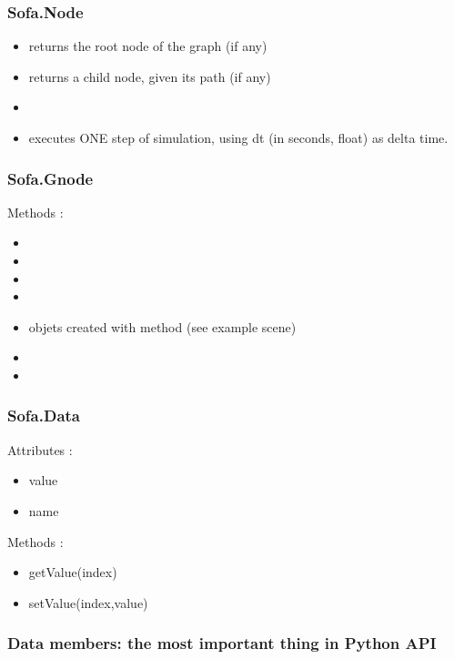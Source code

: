 \subsubsection{Sofa.Node}
\begin{itemize}
\item {} returns the root node of the graph (if any) 
\item {} returns a child node, given its path (if any) 
\item {} 
\item {} executes ONE step of simulation, using dt (in seconds, float) as delta time. 
\end{itemize}
\subsubsection{Sofa.Gnode}
Methods :
\begin{itemize}
\item {} 
\item {} 
\item {} 
\item {} 
\item {} objets created with  method  (see example scene)
\item {} 
\item {} 
\end{itemize}


\subsubsection{Sofa.Data}
Attributes :
\begin{itemize}
\item value
\item name
\end{itemize}
Methods :
\begin{itemize}
\item getValue(index)
\item setValue(index,value)
\end{itemize}

\subsubsection{Data members: the most important thing in \sofa Python API}

